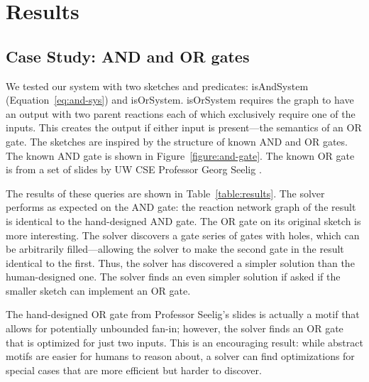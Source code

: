 \documentclass{article}[10pt]
\begin{document}
\section{Results}

\subsection{Case Study: AND and OR gates}

We tested our system with two sketches and predicates: isAndSystem 
(Equation~\ref{eq:and-sys}) and isOrSystem. isOrSystem
requires the graph to have an output
with two parent reactions each of which exclusively
require one of the inputs. This creates the output
if either input is present---the semantics of an OR gate.
The sketches are inspired by the structure of
known AND and OR gates. The known AND gate is shown in
Figure~\ref{figure:and-gate}. The known OR gate is from
a set of slides by UW CSE Professor Georg Seelig \cite{seelig}.

The results of these queries are shown in Table~\ref{table:results}.
The solver performs as expected on the AND gate: the reaction network
graph of the result is identical to the hand-designed AND gate.
The OR gate on its original sketch is more interesting.
The solver discovers a gate series of gates with holes,
which can be arbitrarily filled---allowing the solver to make
the second gate in the result identical to the first.
Thus, the solver has
discovered a simpler solution than the human-designed one.
The solver finds an even simpler solution if asked
if the smaller sketch can implement an OR gate.

The hand-designed OR gate from Professor Seelig's slides is actually a motif
that allows for potentially unbounded fan-in; however, the solver
finds an OR gate that is optimized for just two inputs. This
is an encouraging result: while abstract motifs are easier for
humans to reason about, a solver can find optimizations
for special cases that are more efficient but harder to discover.
\end{document}

